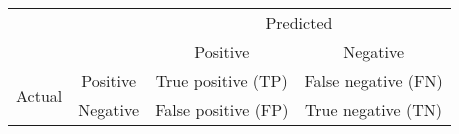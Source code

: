 \begin{tabular}{cc|cc}
 &  & \multicolumn{2}{c}{Predicted} \\ \cline{3-4} 
 &  & Positive & Negative \\ \hline
\multicolumn{1}{l|}{\multirow{2}{*}{Actual}} & Positive & True positive (TP) & False negative (FN) \\
\multicolumn{1}{l|}{} & Negative & False positive (FP) & True negative (TN)
\end{tabular}

